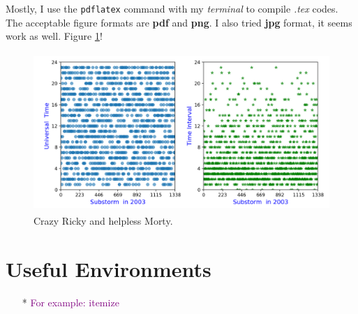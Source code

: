 \documentclass[12pt, letterpaper]{article} %
\begin{document}
Mostly, I use the  {\tt pdflatex} command with my \textit{terminal} to compile \textit{.tex} codes. The acceptable figure 
formats are \textbf{pdf} and \textbf{png}. I also tried \textbf{jpg} format, it seems work as well. 
Figure \ref{fig:rick}! %
\begin{figure}[!t] %
\begin{center} %
  \includegraphics[width=12cm,height=6cm]{Time Interval.png} %
  \caption{Crazy Ricky and helpless Morty.} %
  \label{fig:rick} %
\end{center} %
\end{figure} %



\section{Useful Environments} %
\begin{itemize} %
\item[*] \textcolor{purple}{For example: itemize} %
\end{itemize}  %

\begin{abstract}  %
\begin{quote} %
The \LaTeX  $ $ environment is a template with functions, as long as the data is entered in the prescribed format, the 
system will automatically complete the form.
\end{quote} %
\end{abstract} %
\end{document}
